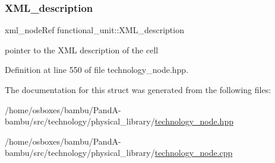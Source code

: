 \subsubsection{\texorpdfstring{X\+M\+L\+\_\+description}{XML\_description}}
{\footnotesize\ttfamily xml\+\_\+node\+Ref functional\+\_\+unit\+::\+X\+M\+L\+\_\+description}



pointer to the X\+ML description of the cell 



Definition at line 550 of file technology\+\_\+node.\+hpp.



The documentation for this struct was generated from the following files\+:\begin{DoxyCompactItemize}
\item 
/home/osboxes/bambu/\+Pand\+A-\/bambu/src/technology/physical\+\_\+library/\hyperlink{technology__node_8hpp}{technology\+\_\+node.\+hpp}\item 
/home/osboxes/bambu/\+Pand\+A-\/bambu/src/technology/physical\+\_\+library/\hyperlink{technology__node_8cpp}{technology\+\_\+node.\+cpp}\end{DoxyCompactItemize}
